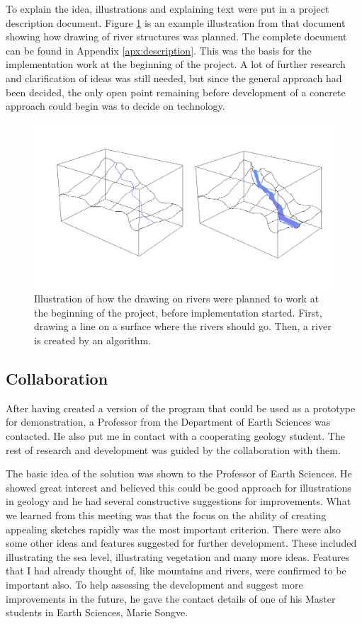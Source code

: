 \documentclass[a4paper,12pt]{report}
\begin{document}
To explain the idea, illustrations and explaining text were put in a project description document. Figure \ref{fig:riverDesription} is an example illustration from that document showing how drawing of river structures was planned. The complete document can be found in Appendix \ref{apx:description}. This was the basis for the implementation work at the beginning of the project. A lot of further research and clarification of ideas was still needed, but since the general approach had been decided, the only open point remaining before development of a concrete approach could begin was to decide on technology.

\begin{figure}
 \includegraphics[width=\linewidth]{thesis/river.png}
 \caption{Illustration of how the drawing on rivers were planned to work at the beginning of the project, before implementation started. First, drawing a line on a surface where the rivers should go. Then, a river is created by an algorithm.}
 \label{fig:riverDesription}
\end{figure}


\subsection{Collaboration}
After having created a version of the program that could be used as a prototype for demonstration, a Professor from the Department of Earth Sciences was contacted. He also put me in contact with a cooperating geology student. The rest of research and development was guided by the collaboration with them. 

The basic idea of the solution was shown to the Professor of Earth Sciences. He showed great interest and believed this could be good approach for illustrations in geology and he had several constructive suggestions for improvements. What we learned from this meeting was that the focus on the ability of creating appealing sketches rapidly was the most important criterion. There were also some other ideas and features suggested for further development. These included illustrating the sea level, illustrating vegetation and many more ideas. Features that I had already thought of, like mountains and rivers, were confirmed to be important also. To help assessing the development and suggest more improvements in the future, he gave the contact details of one of his Master students in Earth Sciences, Marie Songve.
\end{document}
